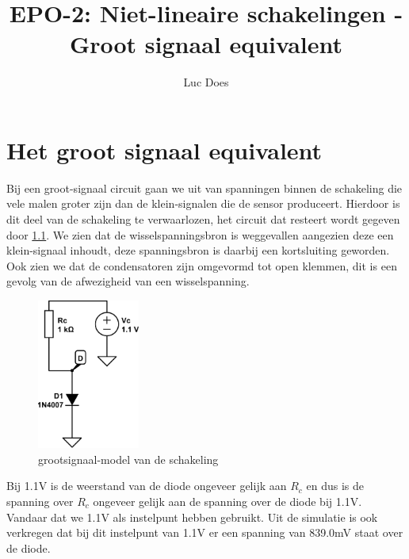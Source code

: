 \documentclass{report}
\title{EPO-2: Niet-lineaire schakelingen - Groot signaal equivalent}
\author{Luc Does}
\begin{document}
\chapter{Het groot signaal equivalent}
\label{ch:Groot signaal equivalent}

Bij een groot-signaal circuit gaan we uit van spanningen binnen de schakeling die vele malen groter zijn dan de klein-signalen die de sensor produceert. Hierdoor is dit deel van de schakeling te verwaarlozen, het circuit dat resteert wordt gegeven door \ref{fig:groot}.
We zien dat de wisselspanningsbron is weggevallen aangezien deze een klein-signaal inhoudt, deze spanningsbron is daarbij een kortsluiting geworden. Ook zien we dat de condensatoren zijn omgevormd tot open klemmen, dit is een gevolg van de afwezigheid van een wisselspanning.
\begin{figure}[H]
	\centering
	\includegraphics[width=0.3\textwidth]{grootsignaalmodel.png}
	\caption{grootsignaal-model van de schakeling}
	\label{fig:groot}
\end{figure}

\noindent Bij 1.1V is de weerstand van de diode ongeveer gelijk aan $R_c$ en dus is de spanning over $R_c$ ongeveer gelijk aan de spanning over de diode bij 1.1V. Vandaar dat we 1.1V als instelpunt hebben gebruikt. Uit de simulatie is ook verkregen dat bij dit instelpunt van 1.1V er een spanning van 839.0mV staat over de diode.
\end{document}
